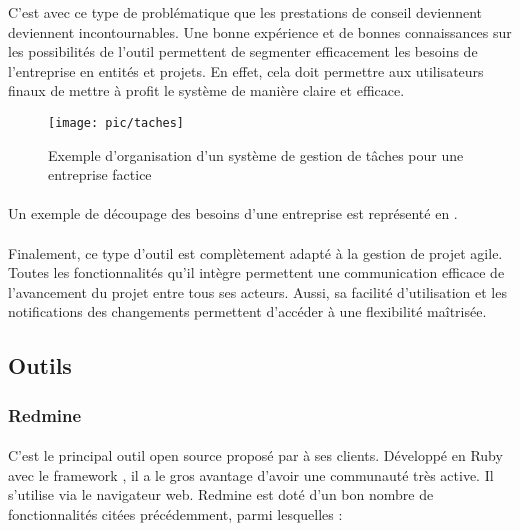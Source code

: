 C'est avec ce type de problématique que les prestations de conseil deviennent deviennent incontournables.
Une bonne expérience et de bonnes connaissances sur les possibilités de l'outil permettent de segmenter efficacement les besoins de l'entreprise en entités et projets.
En effet, cela doit permettre aux utilisateurs finaux de mettre à profit le système de manière claire et efficace.

\begin{figure}
	\centering
	\texttt{[image: pic/taches]}
	\caption{Exemple d'organisation d'un système de gestion de tâches pour une entreprise factice}
	\label{figure:pic-projet:taches}
\end{figure}

\paragraph{}
Un exemple de découpage des besoins d'une entreprise est représenté en .

\paragraph{}
Finalement, ce type d'outil est complètement adapté à la gestion de projet agile.
Toutes les fonctionnalités qu'il intègre permettent une communication efficace de l'avancement du projet entre tous ses acteurs.
Aussi, sa facilité d'utilisation et les notifications des changements permettent d'accéder à une flexibilité maîtrisée.



\subsection{Outils}

\subsubsection{Redmine}

\paragraph{}
C'est le principal outil open source proposé par \asmile{} à ses clients.
Développé en Ruby avec le framework \aror, il a le gros avantage d'avoir une communauté très active.
Il s'utilise via le navigateur web.
Redmine est doté d'un bon nombre de fonctionnalités citées précédemment, parmi lesquelles :

